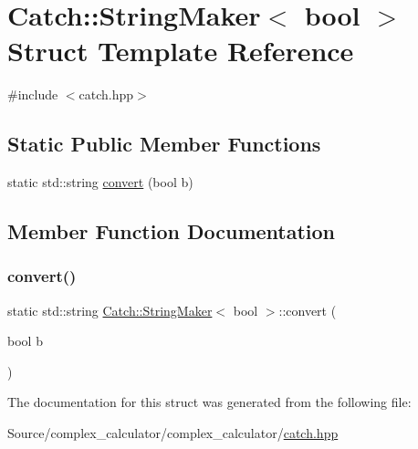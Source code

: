 \hypertarget{struct_catch_1_1_string_maker_3_01bool_01_4}{}\section{Catch\+:\+:String\+Maker$<$ bool $>$ Struct Template Reference}
\label{struct_catch_1_1_string_maker_3_01bool_01_4}


{\ttfamily \#include $<$catch.\+hpp$>$}

\subsection*{Static Public Member Functions}
\begin{DoxyCompactItemize}
\item 
static std\+::string \mbox{\hyperlink{struct_catch_1_1_string_maker_3_01bool_01_4_a37e9899c82c4b4515f876f16f8957a77}{convert}} (bool b)
\end{DoxyCompactItemize}


\subsection{Member Function Documentation}
\mbox{\label{struct_catch_1_1_string_maker_3_01bool_01_4_a37e9899c82c4b4515f876f16f8957a77}} 
\subsubsection{\texorpdfstring{convert()}{convert()}}
{\footnotesize\ttfamily static std\+::string \mbox{\hyperlink{struct_catch_1_1_string_maker}{Catch\+::\+String\+Maker}}$<$ bool $>$\+::convert (\begin{DoxyParamCaption}\item[{bool}]{b }\end{DoxyParamCaption})\hspace{0.3cm}{\ttfamily [static]}}



The documentation for this struct was generated from the following file\+:\begin{DoxyCompactItemize}
\item 
Source/complex\+\_\+calculator/complex\+\_\+calculator/\mbox{\hyperlink{catch_8hpp}{catch.\+hpp}}\end{DoxyCompactItemize}
